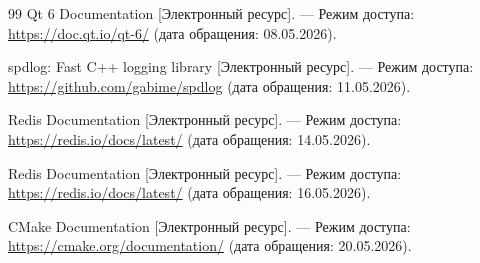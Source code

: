 \begin{thebibliography}{99}
	Qt 6 Documentation [Электронный ресурс]. — Режим доступа:
	\url{https://doc.qt.io/qt-6/} (дата обращения: 08.05.2026).
	
	spdlog: Fast C++ logging library [Электронный ресурс]. — Режим доступа:
	\url{https://github.com/gabime/spdlog} (дата обращения: 11.05.2026).
	
	Redis Documentation [Электронный ресурс]. — Режим доступа:
	\url{https://redis.io/docs/latest/} (дата обращения: 14.05.2026).
	
	Redis Documentation [Электронный ресурс]. — Режим доступа:
	\url{https://redis.io/docs/latest/} (дата обращения: 16.05.2026).
	
	CMake Documentation [Электронный ресурс]. — Режим доступа:
	\url{https://cmake.org/documentation/} (дата обращения: 20.05.2026).
	
\end{thebibliography}